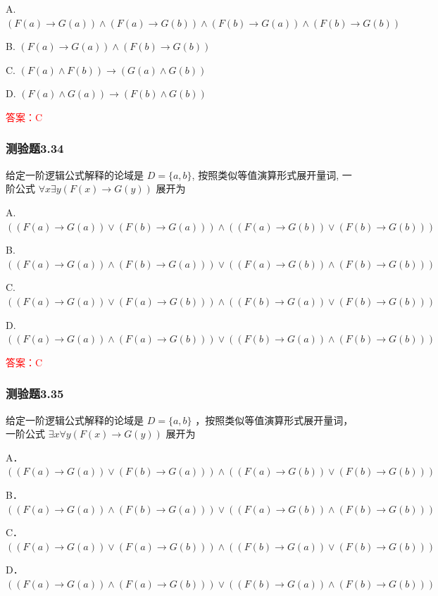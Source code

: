 \documentclass[UTF8, heading=true]{ctexart}
\begin{document}
A. $(F(a) \rightarrow G(a)) \wedge(F(a) \rightarrow G(b)) \wedge(F(b) \rightarrow G(a)) \wedge(F(b) \rightarrow G(b))$

B. $(F(a) \rightarrow G(a)) \wedge(F(b) \rightarrow G(b))$

C. $(F(a) \wedge F(b)) \rightarrow(G(a) \wedge G(b))$

D. $(F(a) \wedge G(a)) \rightarrow(F(b) \wedge G(b))$

\textcolor{red}{答案：C}

\subsubsection{测验题3.34}

给定一阶逻辑公式解释的论域是 $D=\{a, b\}$, 按照类似等值演算形式展开量词, 一阶公式 $\forall x \exists y(F(x) \rightarrow G(y))$ 展开为 $\qquad$

A. $((F(a) \rightarrow G(a)) \vee(F(b) \rightarrow G(a))) \wedge((F(a) \rightarrow G(b)) \vee(F(b) \rightarrow G(b)))$

B. $((F(a) \rightarrow G(a)) \wedge(F(b) \rightarrow G(a))) \vee((F(a) \rightarrow G(b)) \wedge(F(b) \rightarrow G(b)))$

C. $((F(a) \rightarrow G(a)) \vee(F(a) \rightarrow G(b))) \wedge((F(b) \rightarrow G(a)) \vee(F(b) \rightarrow G(b)))$

D. $((F(a) \rightarrow G(a)) \wedge(F(a) \rightarrow G(b))) \vee((F(b) \rightarrow G(a)) \wedge(F(b) \rightarrow G(b)))$

\textcolor{red}{答案：C}

\subsubsection{测验题3.35}

给定一阶逻辑公式解释的论域是 $D=\{a, b\}$ ，按照类似等值演算形式展开量词，一阶公式 $\exists x \forall y(F(x) \rightarrow G(y))$ 展开为 $\qquad$

A．$
((F(a) \rightarrow G(a)) \vee(F(b) \rightarrow G(a))) \wedge((F(a) \rightarrow G(b)) \vee(F(b) \rightarrow G(b)))
$


B．$
((F(a) \rightarrow G(a)) \wedge(F(b) \rightarrow G(a))) \vee((F(a) \rightarrow G(b)) \wedge(F(b) \rightarrow G(b)))
$


C．$
((F(a) \rightarrow G(a)) \vee(F(a) \rightarrow G(b))) \wedge((F(b) \rightarrow G(a)) \vee(F(b) \rightarrow G(b)))
$


D．$
((F(a) \rightarrow G(a)) \wedge(F(a) \rightarrow G(b))) \vee((F(b) \rightarrow G(a)) \wedge(F(b) \rightarrow G(b)))
$
\end{document}
